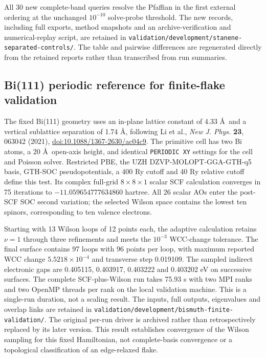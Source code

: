 \documentclass[11pt]{article}
\begin{document}
All 30 new complete-band queries resolve the Pfaffian in the first
external ordering at the unchanged $10^{-10}$ solve-probe threshold.
The new records, including full exports, method snapshots and an
archive-verification and numerical-replay script, are retained in
\nolinkurl{validation/development/stanene-separated-controls/}.
The table and pairwise differences are regenerated directly from
the retained reports rather than transcribed from run summaries.

\subsection{Bi(111) periodic reference for finite-flake validation}
\label{sec:si-bismuth-finite}
The fixed Bi(111) geometry uses an in-plane lattice constant of
4.33 \AA\ and a vertical sublattice separation of 1.74 \AA,
following Li et al., \emph{New J. Phys.} \textbf{23}, 063042 (2021),
\href{https://doi.org/10.1088/1367-2630/ac04c9}{doi:10.1088/1367-2630/ac04c9}.
The primitive cell has two Bi atoms, a 20 \AA\ open-axis height,
and identical \texttt{PERIODIC XY} settings for the cell and Poisson
solver. Restricted PBE, the UZH DZVP-MOLOPT-GGA-GTH-q5 basis,
GTH-SOC pseudopotentials, a 400 Ry cutoff and 40 Ry relative cutoff
define this test. Its complex full-grid $8\times8\times1$ scalar
SCF calculation converges in 75 iterations to
$-11.059654777634860$ hartree. All 26 scalar AOs enter the
post-SCF SOC second variation; the selected Wilson space contains
the lowest ten spinors, corresponding to ten valence electrons.

Starting with 13 Wilson loops of 12 points each, the adaptive
calculation retains $\nu=1$ through three refinements and meets
the $10^{-3}$ WCC-change tolerance. The final surface contains
97 loops with 96 points per loop, with maximum reported WCC
change $5.5218\times10^{-4}$ and transverse step 0.019109.
The sampled indirect electronic gaps are 0.405115, 0.403917,
0.403222 and 0.403202 eV on successive surfaces. The complete
SCF-plus-Wilson run takes 75.93 s with two MPI ranks and two
OpenMP threads per rank on the local validation machine. This
is a single-run duration, not a scaling result.
The inputs, full outputs, eigenvalues and overlap links are retained
in \nolinkurl{validation/development/bismuth-finite-validation/}.
The original per-run driver is archived rather than retrospectively
replaced by its later version. This result establishes convergence
of the Wilson sampling for this fixed Hamiltonian, not complete-basis
convergence or a topological classification of an edge-relaxed flake.
\end{document}
